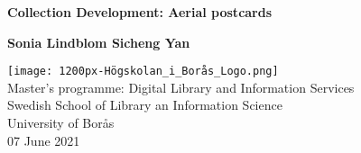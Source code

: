 \begin{titlepage}
	\begin{center}
		\vspace*{1cm}
		
		{\Large \textbf{Collection Development: Aerial postcards}}
		
		\vspace{0.5cm}
	
		
		\vspace{1.5cm}
		
		\textbf{Sonia Lindblom \quad \quad Sicheng Yan}
		
		\vfill
		
		
		
		\vspace{0.8cm}
		
		\texttt{[image: 1200px-Högskolan\_i\_Borås\_Logo.png]}\\
		\vspace{0.4cm}
		Master's programme: Digital Library and Information Services\\
		Swedish School of Library an Information Science \\
		University of Borås\\
		07 June 2021
	
		
	\end{center}
\end{titlepage}